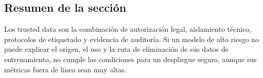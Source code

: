 \subsection{Resumen de la sección}

Los trusted data son la combinación de autorización legal, aislamiento técnico, protocolos de etiquetado y evidencia de auditoría. Si un modelo de alto riesgo no puede explicar el origen, el uso y la ruta de eliminación de sus datos de entrenamiento, no cumple las condiciones para un despliegue seguro, aunque sus métricas fuera de línea sean muy altas.
